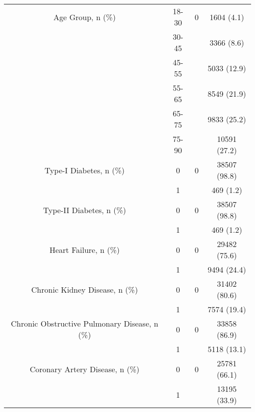 \begin{tabular}{cccc}
Age Group, n (\%) & 18-30 &       0 &    1604 (4.1) \\
                               & 30-45 &         &    3366 (8.6) \\
                               & 45-55 &         &   5033 (12.9) \\
                               & 55-65 &         &   8549 (21.9) \\
                               & 65-75 &         &   9833 (25.2) \\
                               & 75-90 &         &  10591 (27.2) \\
Type-I Diabetes, n (\%) & 0 &       0 &  38507 (98.8) \\
                               & 1 &         &     469 (1.2) \\
Type-II Diabetes, n (\%) & 0 &       0 &  38507 (98.8) \\
                               & 1 &         &     469 (1.2) \\
Heart Failure, n (\%) & 0 &       0 &  29482 (75.6) \\
                               & 1 &         &   9494 (24.4) \\
Chronic Kidney Disease, n (\%) & 0 &       0 &  31402 (80.6) \\
                               & 1 &         &   7574 (19.4) \\
Chronic Obstructive Pulmonary Disease, n (\%) & 0 &       0 &  33858 (86.9) \\
                               & 1 &         &   5118 (13.1) \\
Coronary Artery Disease, n (\%) & 0 &       0 &  25781 (66.1) \\
                               & 1 &         &  13195 (33.9) \\
\bottomrule
\end{tabular}
